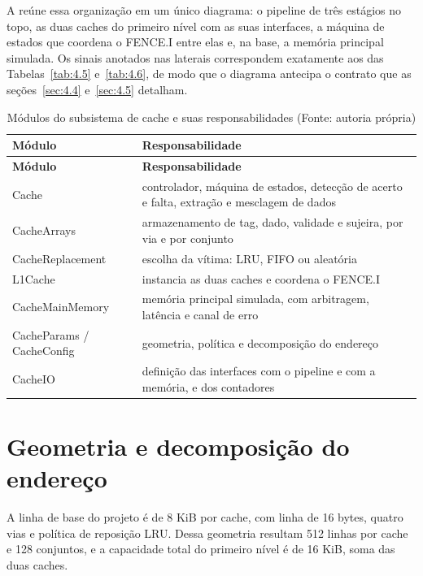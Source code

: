 A  reúne essa organização em um único diagrama: o pipeline de três estágios no topo, as duas caches do primeiro nível com as suas interfaces, a máquina de estados que coordena o FENCE.I entre elas e, na base, a memória principal simulada. Os sinais anotados nas laterais correspondem exatamente aos das Tabelas~\ref{tab:4.5} e~\ref{tab:4.6}, de modo que o diagrama antecipa o contrato que as seções~\ref{sec:4.4} e~\ref{sec:4.5} detalham.


{\small
\begin{longtable}{@{}>{\raggedright\arraybackslash}p{}>{\raggedright\arraybackslash}p{}@{}}
\caption[Módulos do subsistema de cache e suas responsabilidades]{Módulos do subsistema de cache e suas responsabilidades (Fonte: autoria própria)}\label{tab:4.1}\\
\hline
\textbf{Módulo} & \textbf{Responsabilidade} \\
\hline
\endfirsthead
\hline
\textbf{Módulo} & \textbf{Responsabilidade} \\
\hline
\endhead
\hline
\endlastfoot
Cache & controlador, máquina de estados, detecção de acerto e falta, extração e mesclagem de dados \\
CacheArrays & armazenamento de tag, dado, validade e sujeira, por via e por conjunto \\
CacheReplacement & escolha da vítima: LRU, FIFO ou aleatória \\
L1Cache & instancia as duas caches e coordena o FENCE.I \\
CacheMainMemory & memória principal simulada, com arbitragem, latência e canal de erro \\
CacheParams / CacheConfig & geometria, política e decomposição do endereço \\
CacheIO & definição das interfaces com o pipeline e com a memória, e dos contadores \\
\end{longtable}
}

\section{Geometria e decomposição do endereço}\label{sec:4.2}

A linha de base do projeto é de 8 KiB por cache, com linha de 16 bytes, quatro vias e política de reposição LRU. Dessa geometria resultam 512 linhas por cache e 128 conjuntos, e a capacidade total do primeiro nível é de 16 KiB, soma das duas caches.

